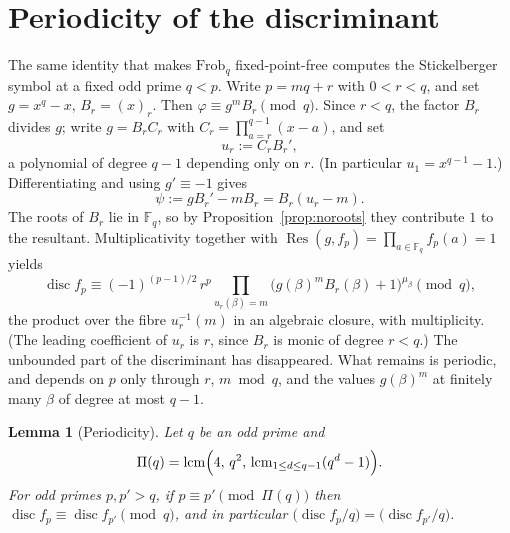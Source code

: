 \documentclass[11pt,a4paper]{amsart}
\newcommand{\F}{\mathbb{F}}
\newcommand{\disc}{\operatorname{disc}}
\newcommand{\Res}{\operatorname{Res}}
\newcommand{\Frob}{\mathrm{Frob}}
\theoremstyle{plain}
\newtheorem{lemma}[theorem]{Lemma}
\theoremstyle{definition}
\begin{document}
\section{Periodicity of the discriminant}
\label{sec:period}

The same identity that makes \(\Frob_q\) fixed-point-free computes the Stickelberger symbol at a fixed odd prime \(q<p\). Write \(p=mq+r\) with \(0<r<q\), and set \(g=x^q-x\), \(B_r=(x)_r\). Then \(\varphi\equiv g^m B_r\pmod q\). Since \(r<q\), the factor \(B_r\) divides \(g\); write \(g=B_r C_r\) with \(C_r=\prod_{a=r}^{q-1}(x-a)\), and set
\[
u_r:=C_r B_r',
\]
a polynomial of degree \(q-1\) depending only on \(r\). (In particular \(u_1=x^{q-1}-1\).) Differentiating and using \(g'\equiv-1\) gives
\[
\psi:=g B_r'-m B_r=B_r(u_r-m).
\]
The roots of \(B_r\) lie in \(\F_q\), so by Proposition~\ref{prop:noroots} they contribute \(1\) to the resultant. Multiplicativity together with \(\Res(g,f_p)=\prod_{a\in\F_q}f_p(a)=1\) yields
\begin{equation}
\label{eq:res}
\disc f_p\equiv(-1)^{(p-1)/2}\,r^p\prod_{u_r(\beta)=m}\bigl(g(\beta)^m B_r(\beta)+1\bigr)^{\mu_\beta}\pmod q,
\end{equation}
the product over the fibre \(u_r^{-1}(m)\) in an algebraic closure, with multiplicity. (The leading coefficient of \(u_r\) is \(r\), since \(B_r\) is monic of degree \(r<q\).) The unbounded part of the discriminant has disappeared. What remains is periodic, and depends on \(p\) only through \(r\), \(m\bmod q\), and the values \(g(\beta)^m\) at finitely many \(\beta\) of degree at most \(q-1\).

\begin{lemma}[Periodicity]
\label{lem:period}
Let \(q\) be an odd prime and
\[
\Pi(q)=\mathrm{lcm}\Bigl(4,\,q^2,\,\mathrm{lcm}_{1\le d\le q-1}(q^d-1)\Bigr).
\]
For odd primes \(p,p'>q\), if \(p\equiv p'\pmod{\Pi(q)}\) then \(\disc f_p\equiv\disc f_{p'}\pmod q\), and in particular \(\bigl(\disc f_p/q\bigr)=\bigl(\disc f_{p'}/q\bigr)\).
\end{lemma}
\end{document}
